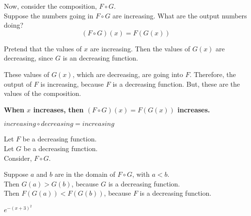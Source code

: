\documentclass{ximera}
\begin{document}
Now, consider the composition, $F \circ G$. \\


Suppose the numbers going in $F \circ G$ are increasing.  What are the output numbers doing? \\




\[ (F \circ G)(x) = F(G(x)) \]


Pretend that the values of $x$ are increasing. Then the values of $G(x)$ are decreasing, since $G$ is an decreasing function.

These values of $G(x)$, which are decreasing, are going into $F$.  Therefore, the output of $F$ is increasing, because $F$ is a decreasing function.  But, these are the values of the composition.



\begin{center}
\textbf{\textcolor{red!80!black}{When $x$ increases, then $(F \circ G)(x) = F(G(x))$ increases.}}
\end{center}






\begin{fact}
$increasing \circ decreasing = increasing$


Let $F$ be a decreasing function. \\
Let $G$ be a decreasing function. \\


Consider, $F \circ G$.

Suppose $a$ and $b$ are in the domain of $F \circ G$, with $a < b$. \\

Then $G(a) > G(b)$, because $G$ is a decreasing function. \\

Then $F(G(a)) < F(G(b))$, because $F$ is a decreasing function.


\end{fact}







\begin{example}   $e^{-(x+3)^2}$




\end{example}
\end{document}
